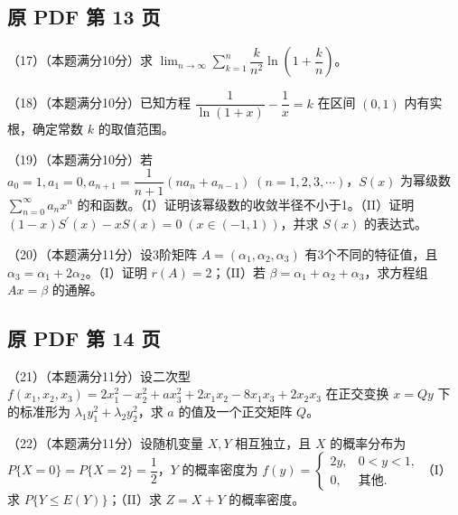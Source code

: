 \documentclass[UTF8,12pt]{ctexart}
\begin{document}
\clearpage

\subsection*{原 PDF 第 13 页}

（17）（本题满分10分）求 \(\displaystyle \lim_{n\to\infty}\displaystyle \sum_{k=1}^n\dfrac{\displaystyle k}{\displaystyle n^2}\ln(1+\dfrac{\displaystyle k}{\displaystyle n})\)。


（18）（本题满分10分）已知方程 \(\displaystyle \dfrac{\displaystyle 1}{\displaystyle \ln(1+x)}-\dfrac{\displaystyle 1}{\displaystyle x}=k\) 在区间 \(\displaystyle (0,\allowbreak 1)\) 内有实根，确定常数 \(\displaystyle k\) 的取值范围。


（19）（本题满分10分）若 \(\displaystyle a_0=1,\allowbreak a_1=0,\allowbreak a_{n+1}=\dfrac{\displaystyle 1}{\displaystyle n+1}(na_n+a_{n-1})\;(n=1,\allowbreak 2,\allowbreak 3,\allowbreak \cdots)\)，\(\displaystyle S(x)\) 为幂级数 \(\displaystyle \sum_{n=0}^{\infty}a_nx^n\) 的和函数。（I）证明该幂级数的收敛半径不小于1。（II）证明 \(\displaystyle (1-x)S^{\prime}(x)-xS(x)=0\;(x\in(-1,\allowbreak 1))\)，并求 \(\displaystyle S(x)\) 的表达式。


（20）（本题满分11分）设3阶矩阵 \(\displaystyle A=(\alpha_1,\allowbreak \alpha_2,\allowbreak \alpha_3)\) 有3个不同的特征值，且 \(\displaystyle \alpha_3=\alpha_1+2\alpha_2\)。（I）证明 \(\displaystyle r(A)=2\)；（II）若 \(\displaystyle \beta=\alpha_1+\alpha_2+\alpha_3\)，求方程组 \(\displaystyle Ax=\beta\) 的通解。


\clearpage

\subsection*{原 PDF 第 14 页}

（21）（本题满分11分）设二次型 \(\displaystyle f(x_1,\allowbreak x_2,\allowbreak x_3)=2x_1^2-x_2^2+ax_3^2+2x_1x_2-8x_1x_3+2x_2x_3\) 在正交变换 \(\displaystyle x=Qy\) 下的标准形为 \(\displaystyle \lambda_1y_1^2+\lambda_2y_2^2\)，求 \(\displaystyle a\) 的值及一个正交矩阵 \(\displaystyle Q\)。


（22）（本题满分11分）设随机变量 \(\displaystyle X,\allowbreak Y\) 相互独立，且 \(\displaystyle X\) 的概率分布为 \(\displaystyle P\{X=0\}=P\{X=2\}=\dfrac{\displaystyle 1}{\displaystyle 2}\)，\(\displaystyle Y\) 的概率密度为 \(\displaystyle f(y)=\begin{cases}2y,\allowbreak &0<y<1,\allowbreak \\0,\allowbreak &\text{其他}.\end{cases}\)（I）求 \(\displaystyle P\{Y\le E(Y)\}\)；（II）求 \(\displaystyle Z=X+Y\) 的概率密度。
\end{document}
